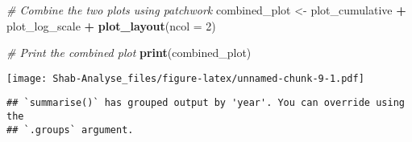 \documentclass[
]{article}
\newenvironment{Shaded}{\begin{snugshade}}{\end{snugshade}}
\newcommand{\AttributeTok}[1]{\textcolor[rgb]{0.13,0.29,0.53}{#1}}
\newcommand{\CommentTok}[1]{\textcolor[rgb]{0.56,0.35,0.01}{\textit{#1}}}
\newcommand{\DecValTok}[1]{\textcolor[rgb]{0.00,0.00,0.81}{#1}}
\newcommand{\FunctionTok}[1]{\textcolor[rgb]{0.13,0.29,0.53}{\textbf{#1}}}
\newcommand{\NormalTok}[1]{#1}
\newcommand{\OtherTok}[1]{\textcolor[rgb]{0.56,0.35,0.01}{#1}}
\newcommand{\SpecialCharTok}[1]{\textcolor[rgb]{0.81,0.36,0.00}{\textbf{#1}}}
\newcommand{\StringTok}[1]{\textcolor[rgb]{0.31,0.60,0.02}{#1}}
\begin{document}
\begin{Shaded}
\begin{Highlighting}[]
\CommentTok{\# Combine the two plots using patchwork}
\NormalTok{combined\_plot }\OtherTok{\textless{}{-}}\NormalTok{ plot\_cumulative }\SpecialCharTok{+}\NormalTok{ plot\_log\_scale }\SpecialCharTok{+} \FunctionTok{plot\_layout}\NormalTok{(}\AttributeTok{ncol =} \DecValTok{2}\NormalTok{)}

\CommentTok{\# Print the combined plot}
\FunctionTok{print}\NormalTok{(combined\_plot)}
\end{Highlighting}
\end{Shaded}

\texttt{[image: Shab-Analyse\_files/figure-latex/unnamed-chunk-9-1.pdf]}

\begin{Shaded}
\end{Shaded}

\begin{verbatim}
## `summarise()` has grouped output by 'year'. You can override using the
## `.groups` argument.
\end{verbatim}
\end{document}
